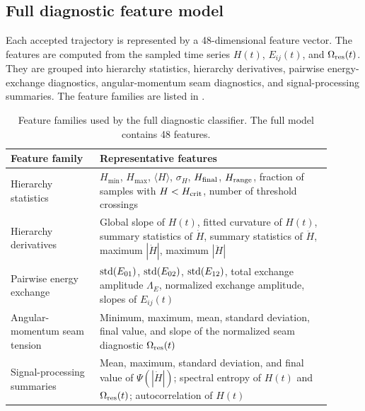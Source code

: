 \documentclass[12pt,a4paper]{article}
\newcommand{\Hcrit}{H_{\rm crit}}
\newcommand{\Hmin}{H_{\min}}
\newcommand{\Ores}{\Omega_{\rm res}}
\begin{document}
\subsection{Full diagnostic feature model}
\label{sec:full_diagnostic_model}

Each accepted trajectory is represented by a 48-dimensional feature vector. The features are computed from the sampled time series \(H(t)\), \(E_{ij}(t)\), and \(\Ores(t)\). They are grouped into hierarchy statistics, hierarchy derivatives, pairwise energy-exchange diagnostics, angular-momentum seam diagnostics, and signal-processing summaries. The feature families are listed in .

\begin{table}[H]
\centering
\caption{Feature families used by the full diagnostic classifier. The full model contains 48 features.}
\label{tab:feature_families}
\begin{tabular}{p{0.25\linewidth}p{0.65\linewidth}}
\toprule
Feature family & Representative features \\
\midrule
Hierarchy statistics &
\(\Hmin\), \(H_{\max}\), \(\langle H\rangle\), \(\sigma_H\), \(H_{\rm final}\), \(H_{\rm range}\), fraction of samples with \(H<\Hcrit\), number of threshold crossings \\[3pt]

Hierarchy derivatives &
Global slope of \(H(t)\), fitted curvature of \(H(t)\), summary statistics of \(\dot H\), summary statistics of \(\ddot H\), maximum \(|\dot H|\), maximum \(|\ddot H|\) \\[3pt]

Pairwise energy exchange &
\({\rm std}(E_{01})\), \({\rm std}(E_{02})\), \({\rm std}(E_{12})\), total exchange amplitude \(\Lambda_E\), normalized exchange amplitude, slopes of \(E_{ij}(t)\) \\[3pt]

Angular-momentum seam tension &
Minimum, maximum, mean, standard deviation, final value, and slope of the normalized seam diagnostic \(\Ores(t)\) \\[3pt]

Signal-processing summaries &
Mean, maximum, standard deviation, and final value of \(\Psi(|\dot H|)\); spectral entropy of \(H(t)\) and \(\Ores(t)\); autocorrelation of \(H(t)\) \\
\bottomrule
\end{tabular}
\end{table}
\end{document}
